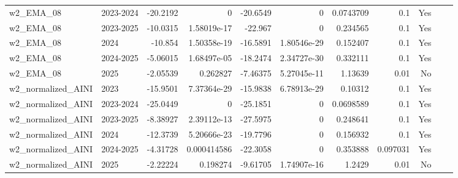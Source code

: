 \begin{longtable}{llrrrrrrrrl}
w2\_EMA\_08 & 2023-2024 & -20.2192 & 0 & -20.6549 & 0 & 0.0743709 & 0.1 & Yes \\
w2\_EMA\_08 & 2023-2025 & -10.0315 & 1.58019e-17 & -22.967 & 0 & 0.234565 & 0.1 & Yes \\
w2\_EMA\_08 & 2024 & -10.854 & 1.50358e-19 & -16.5891 & 1.80546e-29 & 0.152407 & 0.1 & Yes \\
w2\_EMA\_08 & 2024-2025 & -5.06015 & 1.68497e-05 & -18.2474 & 2.34727e-30 & 0.332111 & 0.1 & Yes \\
w2\_EMA\_08 & 2025 & -2.05539 & 0.262827 & -7.46375 & 5.27045e-11 & 1.13639 & 0.01 & No \\
w2\_normalized\_AINI & 2023 & -15.9501 & 7.37364e-29 & -15.9838 & 6.78913e-29 & 0.10312 & 0.1 & Yes \\
w2\_normalized\_AINI & 2023-2024 & -25.0449 & 0 & -25.1851 & 0 & 0.0698589 & 0.1 & Yes \\
w2\_normalized\_AINI & 2023-2025 & -8.38927 & 2.39112e-13 & -27.5975 & 0 & 0.248641 & 0.1 & Yes \\
w2\_normalized\_AINI & 2024 & -12.3739 & 5.20666e-23 & -19.7796 & 0 & 0.156932 & 0.1 & Yes \\
w2\_normalized\_AINI & 2024-2025 & -4.31728 & 0.000414586 & -22.3058 & 0 & 0.353888 & 0.097031 & Yes \\
w2\_normalized\_AINI & 2025 & -2.22224 & 0.198274 & -9.61705 & 1.74907e-16 & 1.2429 & 0.01 & No \\
\end{longtable}
